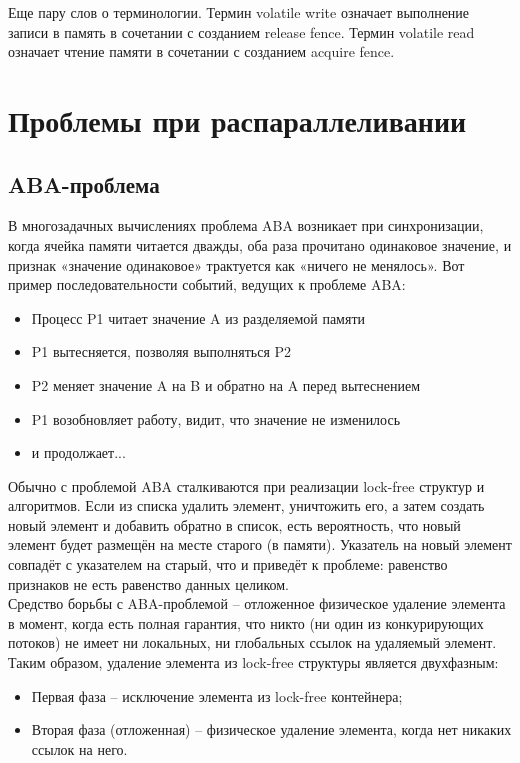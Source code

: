 \documentclass{article}
\begin{document}
Еще пару слов о терминологии. Термин volatile write означает выполнение записи в память в сочетании с созданием release fence. Термин volatile read означает чтение памяти в сочетании с созданием acquire fence.

\newpage

\section{Проблемы при распараллеливании}
\subsection{ABA-проблема}
\label{aba-problem}
В многозадачных вычислениях проблема ABA возникает при синхронизации, когда ячейка памяти читается дважды, оба раза прочитано одинаковое значение, и признак «значение одинаковое» трактуется как «ничего не менялось».
Вот пример последовательности событий, ведущих к проблеме ABA:
\begin{itemize}
    \item Процесс P1 читает значение A из разделяемой памяти
    \item P1 вытесняется, позволяя выполняться P2
    \item P2 меняет значение A на B и обратно на A перед вытеснением
    \item P1 возобновляет работу, видит, что значение не изменилось
    \item и продолжает...
\end{itemize}

Обычно с проблемой ABA сталкиваются при реализации lock-free структур и алгоритмов. Если из списка удалить элемент, уничтожить его, а затем создать новый элемент и добавить обратно в список, есть вероятность, что новый элемент будет размещён на месте старого (в памяти). Указатель на новый элемент совпадёт с указателем на старый, что и приведёт к проблеме: равенство признаков не есть равенство данных целиком.\\

Средство борьбы с ABA-проблемой – отложенное физическое удаление элемента в момент, когда есть полная гарантия, что никто (ни один из конкурирующих потоков) не имеет ни локальных, ни глобальных ссылок на удаляемый элемент.
Таким образом, удаление элемента из lock-free структуры является двухфазным:
\begin{itemize}
    \item Первая фаза – исключение элемента из lock-free контейнера;
    \item Вторая фаза (отложенная) – физическое удаление элемента, когда нет никаких ссылок на него.
\end{itemize}
\end{document}
